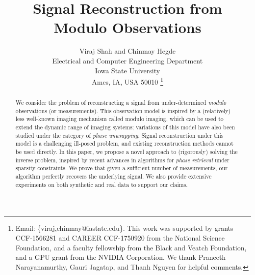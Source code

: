 \documentclass[10pt,journal]{IEEEtran}
\begin{document}
\title{Signal Reconstruction from Modulo Observations}

\author{
	Viraj Shah and Chinmay Hegde \\
	Electrical and Computer Engineering Department \\
	Iowa State University \\
	Ames, IA, USA 50010
	\thanks{Email: \{viraj,chinmay@iastate.edu\}. This work was supported by grants CCF-1566281 and CAREER CCF-1750920 from the National Science Foundation, and a faculty fellowship from the Black and Veatch Foundation, and a GPU grant from the NVIDIA Corporation.	
	We thank Praneeth Narayanamurthy, Gauri Jagatap, and Thanh Nguyen for helpful comments.
}
}


\maketitle

\begin{abstract}
	We consider the problem of reconstructing a signal from under-determined \emph{modulo} observations (or measurements). This observation model is inspired by a (relatively) less well-known imaging mechanism called modulo imaging, which can be used to extend the dynamic range of imaging systems; variations of this model have also been studied under the category of \emph{phase unwrapping}. Signal reconstruction under this model is a challenging ill-posed problem, and existing reconstruction methods cannot be used directly. In this paper, we propose a novel approach to (rigorously) solving the inverse problem, inspired by recent advances in algorithms for \emph{phase retrieval} under sparsity constraints. We prove that given a sufficient number of measurements, our algorithm perfectly recovers the underlying signal. We also provide extensive experiments on both synthetic and real data to support our claims. 
\end{abstract}







%
%
%


%
%
\end{document}
